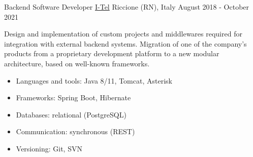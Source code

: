 \begin{cventries}

\cventry
    {Backend Software Developer} %
    {\href{https://i-tel.it}{I-Tel}} %
    {Riccione (RN), Italy} %
    {August 2018 - October 2021} %
    {
      	Design and implementation of custom projects and middlewares required for integration with external backend systems.
      	Migration of one of the company's products from a proprietary development platform to a new modular architecture, based on well-known frameworks.
      	\begin{itemize}
      		\item {Languages and tools: Java 8/11, Tomcat, Asterisk}
      		\item {Frameworks: Spring Boot, Hibernate}
      		\item {Databases: relational (PostgreSQL)}
      		\item {Communication: synchronous (REST)}
      		\item {Versioning: Git, SVN}
      	\end{itemize}
    }


\end{cventries}
